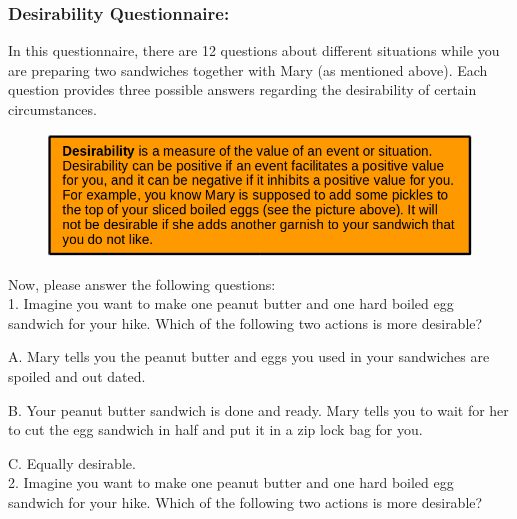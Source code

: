 \documentclass[12pt]{report}
\begin{document}
\begin{appendices}
\pagebreak

\subsubsection{Desirability Questionnaire:}
In this questionnaire, there are 12 questions about different situations while
you are preparing two sandwiches together with Mary (as mentioned above). Each
question provides three possible answers regarding the desirability of certain
circumstances.


\begin{figure}[tbh]
 \centering
 \includegraphics[width=1\textwidth]{figure/desirability-definition.png}
\end{figure}

Now, please answer the following questions:\\


1. Imagine you want to make one peanut butter and one hard boiled egg sandwich for your hike. Which of the following two actions is more desirable?

A. Mary tells you the peanut butter and eggs you used in your sandwiches are spoiled and out dated.

B. Your peanut butter sandwich is done and ready. Mary tells you to wait for her to cut the egg sandwich in half and put it in a zip lock bag for you.

C. Equally desirable.\\


2. Imagine you want to make one peanut butter and one hard boiled egg sandwich for your hike. Which of the following two actions is more desirable?


\end{appendices}
\end{document}
